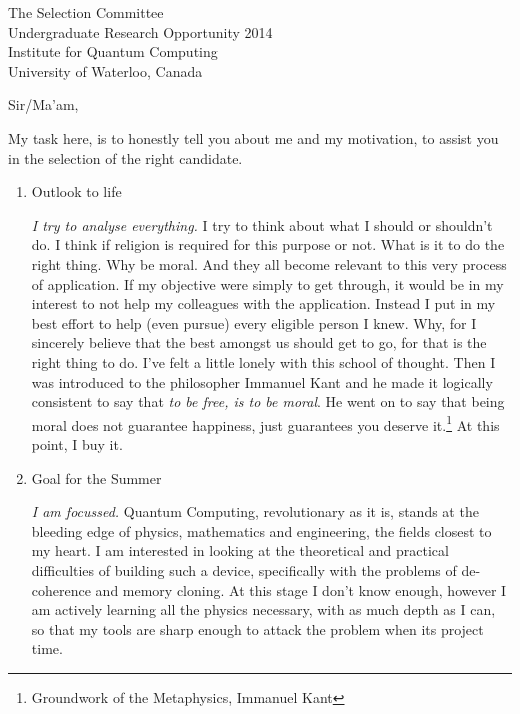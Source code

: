 \documentclass{letter}
\begin{document}

\begin{letter}{The Selection Committee\\Undergraduate Research Opportunity 2014\\Institute for Quantum Computing\\University of Waterloo, Canada} %


\opening{Sir/Ma'am,}

My task here, is to honestly tell you about me and my motivation, to assist you in the selection of the right candidate. 

\begin{enumerate}
\item Outlook to life

\emph{I try to analyse everything.} I try to think about what I should or shouldn't do. I think if religion is required for this purpose or not. What is it to do the right thing. Why be moral. And they all become relevant to this very process of application. If my objective were simply to get through, it would be in my interest to not help my colleagues with the application. Instead I put in my best effort to help (even pursue) every eligible person I knew. Why, for I sincerely believe that the best amongst us should get to go, for that is the right thing to do. I've felt a little lonely with this school of thought. Then I was introduced to the philosopher Immanuel Kant and he made it logically consistent to say that \emph{to be free, is to be moral}. He went on to say that being moral does not guarantee happiness, just guarantees you deserve it.\footnote{Groundwork of the Metaphysics, Immanuel Kant} At this point, I buy it.

\item Goal for the Summer

\emph{I am focussed.} Quantum Computing, revolutionary as it is, stands at the bleeding edge of physics, mathematics and engineering, the fields closest to my heart. I am interested in looking at the theoretical and practical difficulties of building such a device, specifically with the problems of de-coherence and memory cloning. At this stage I don't know enough, however I am actively learning all the physics necessary, with as much depth as I can, so that my tools are sharp enough to attack the problem when its project time.


\end{enumerate}
\end{letter}
\end{document}
